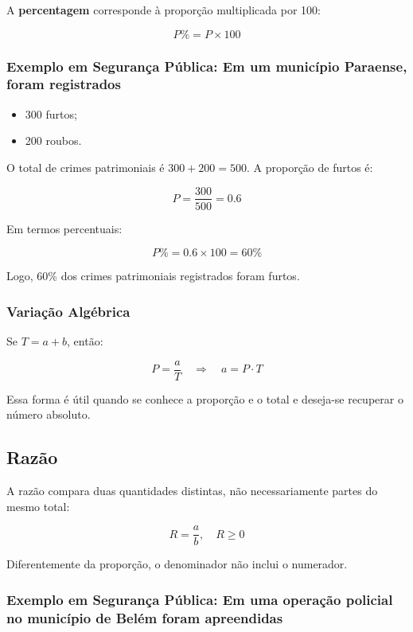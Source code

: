 A \textbf{percentagem} corresponde à proporção multiplicada por 100:

\[
P\% = P \times 100
\]

\subsubsection*{Exemplo em Segurança Pública: Em um município Paraense, foram registrados}

\begin{itemize}
\item 300 furtos;
\item 200 roubos.
\end{itemize}

O total de crimes patrimoniais é $300 + 200 = 500$.  
A proporção de furtos é:

\[
P = \frac{300}{500} = 0.6
\]

Em termos percentuais:

\[
P\% = 0.6 \times 100 = 60\%
\]

Logo, 60\% dos crimes patrimoniais registrados foram furtos.

\subsubsection*{Variação Algébrica}

Se $T = a+b$, então:

\[
P = \frac{a}{T} \quad \Rightarrow \quad a = P \cdot T
\]

Essa forma é útil quando se conhece a proporção e o total e deseja-se recuperar o número absoluto.

\subsection{Razão}

A razão compara duas quantidades distintas, não necessariamente partes do mesmo total:

\[
R = \frac{a}{b}, \quad R \ge 0
\]

Diferentemente da proporção, o denominador não inclui o numerador.

\subsubsection*{Exemplo em Segurança Pública: Em uma operação policial no município de Belém foram apreendidas}


